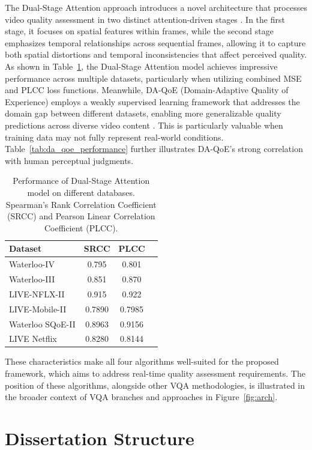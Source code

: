 The Dual-Stage Attention approach introduces a novel architecture that processes video quality assessment in two distinct attention-driven stages \cite{jia2024continuous}. In the first stage, it focuses on spatial features within frames, while the second stage emphasizes temporal relationships across sequential frames, allowing it to capture both spatial distortions and temporal inconsistencies that affect perceived quality. As shown in Table~\ref{tab:dsa_performance}, the Dual-Stage Attention model achieves impressive performance across multiple datasets, particularly when utilizing combined MSE and PLCC loss functions. Meanwhile, DA-QoE (Domain-Adaptive Quality of Experience) employs a weakly supervised learning framework that addresses the domain gap between different datasets, enabling more generalizable quality predictions across diverse video content \cite{li2022weakly}. This is particularly valuable when training data may not fully represent real-world conditions. Table~\ref{tab:da_qoe_performance} further illustrates DA-QoE's strong correlation with human perceptual judgments.

\begin{table}[ht]
\centering
\caption{Performance of Dual-Stage Attention model on different databases. Spearman's Rank Correlation Coefficient (SRCC) and Pearson Linear Correlation Coefficient (PLCC).}
\label{tab:dsa_performance}
\begin{tabular}{lccc}
\hline
\textbf{Dataset} & \textbf{SRCC} & \textbf{PLCC} \\
\hline
Waterloo-IV & 0.795 & 0.801 \\
Waterloo-III & 0.851 & 0.870 \\
LIVE-NFLX-II  & 0.915 & 0.922 \\
LIVE-Mobile-II & 0.7890 & 0.7985 \\
Waterloo SQoE-II & 0.8963 & 0.9156 \\
LIVE Netflix  & 0.8280 & 0.8144 \\
\hline
\end{tabular}
\end{table}

These characteristics make all four algorithms well-suited for the proposed framework, which aims to address real-time quality assessment requirements. The position of these algorithms, alongside other VQA methodologies, is illustrated in the broader context of VQA branches and approaches in Figure~\ref{fig:arch}.

\section{Dissertation Structure} \label{sec:struct}

